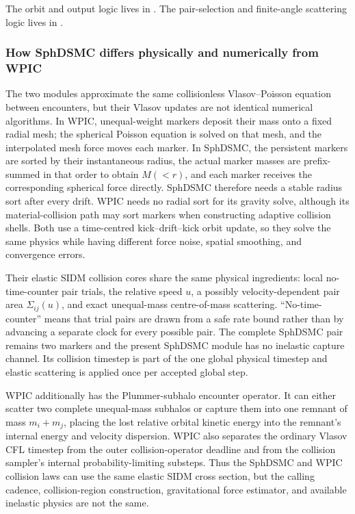 The orbit and output logic lives in
.  The pair-selection and
finite-angle scattering logic lives in
.

\subsubsection{How SphDSMC differs physically and numerically from WPIC}

The two modules approximate the same collisionless Vlasov--Poisson equation
between encounters, but their Vlasov updates are not identical numerical
algorithms.  In WPIC, unequal-weight markers deposit their mass onto a fixed
radial mesh; the spherical Poisson equation is solved on that mesh, and the
interpolated mesh force moves each marker.  In SphDSMC, the persistent markers
are sorted by their instantaneous radius, the actual marker masses are
prefix-summed in that order to obtain \(M(<r)\), and each marker receives the
corresponding spherical force directly.  SphDSMC therefore needs a stable
radius sort after every drift.  WPIC needs no radial sort for its gravity
solve, although its material-collision path may sort markers when constructing
adaptive collision shells.  Both use a time-centred kick--drift--kick orbit
update, so they solve the same physics while having different force noise,
spatial smoothing, and convergence errors.

Their elastic SIDM collision cores share the same physical ingredients:
local no-time-counter pair trials, the relative speed \(u\), a possibly
velocity-dependent pair area \(\Sigma_{ij}(u)\), and exact unequal-mass
centre-of-mass scattering.  ``No-time-counter'' means that trial pairs are
drawn from a safe rate bound rather than by advancing a separate clock for
every possible pair.  The complete SphDSMC pair remains two markers and the
present SphDSMC module has no inelastic capture channel.  Its collision
timestep is part of the one global physical timestep and elastic scattering
is applied once per accepted global step.

WPIC additionally has the Plummer-subhalo encounter operator.  It can either
scatter two complete unequal-mass subhalos or capture them into one remnant of
mass \(m_i+m_j\), placing the lost relative orbital kinetic energy into the
remnant's internal energy and velocity dispersion.  WPIC also separates the
ordinary Vlasov CFL timestep from the outer collision-operator deadline and
from the collision sampler's internal probability-limiting substeps.  Thus
the SphDSMC and WPIC collision laws can use the same elastic SIDM cross section,
but the calling cadence, collision-region construction, gravitational force
estimator, and available inelastic physics are not the same.

